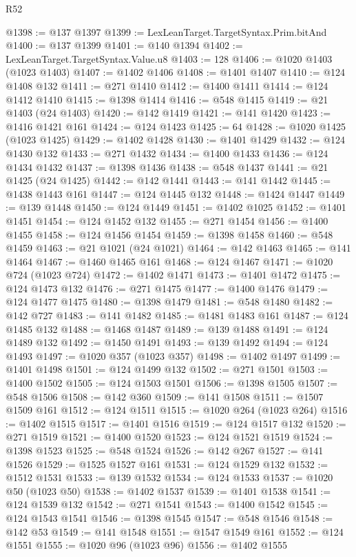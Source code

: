 \begin{lexlean}{R52}
\begin{coremodule}
@1398 := @137 @1397
@1399 := LexLeanTarget.TargetSyntax.Prim.bitAnd
@1400 := @137 @1399
@1401 := @140 @1394
@1402 := LexLeanTarget.TargetSyntax.Value.u8
@1403 := 128
@1406 := @1020 @1403 (@1023 @1403)
@1407 := @1402 @1406
@1408 := @1401 @1407
@1410 := @124 @1408 @132
@1411 := @271 @1410
@1412 := @1400 @1411
@1414 := @124 @1412 @1410
@1415 := @1398 @1414
@1416 := @548 @1415
@1419 := @21 @1403 (@24 @1403)
@1420 := @142 @1419
@1421 := @141 @1420
@1423 := @1416 @1421 @161
@1424 := @124 @1423
@1425 := 64
@1428 := @1020 @1425 (@1023 @1425)
@1429 := @1402 @1428
@1430 := @1401 @1429
@1432 := @124 @1430 @132
@1433 := @271 @1432
@1434 := @1400 @1433
@1436 := @124 @1434 @1432
@1437 := @1398 @1436
@1438 := @548 @1437
@1441 := @21 @1425 (@24 @1425)
@1442 := @142 @1441
@1443 := @141 @1442
@1445 := @1438 @1443 @161
@1447 := @124 @1445 @132
@1448 := @1424 @1447
@1449 := @139 @1448
@1450 := @124 @1449
@1451 := @1402 @1025
@1452 := @1401 @1451
@1454 := @124 @1452 @132
@1455 := @271 @1454
@1456 := @1400 @1455
@1458 := @124 @1456 @1454
@1459 := @1398 @1458
@1460 := @548 @1459
@1463 := @21 @1021 (@24 @1021)
@1464 := @142 @1463
@1465 := @141 @1464
@1467 := @1460 @1465 @161
@1468 := @124 @1467
@1471 := @1020 @724 (@1023 @724)
@1472 := @1402 @1471
@1473 := @1401 @1472
@1475 := @124 @1473 @132
@1476 := @271 @1475
@1477 := @1400 @1476
@1479 := @124 @1477 @1475
@1480 := @1398 @1479
@1481 := @548 @1480
@1482 := @142 @727
@1483 := @141 @1482
@1485 := @1481 @1483 @161
@1487 := @124 @1485 @132
@1488 := @1468 @1487
@1489 := @139 @1488
@1491 := @124 @1489 @132
@1492 := @1450 @1491
@1493 := @139 @1492
@1494 := @124 @1493
@1497 := @1020 @357 (@1023 @357)
@1498 := @1402 @1497
@1499 := @1401 @1498
@1501 := @124 @1499 @132
@1502 := @271 @1501
@1503 := @1400 @1502
@1505 := @124 @1503 @1501
@1506 := @1398 @1505
@1507 := @548 @1506
@1508 := @142 @360
@1509 := @141 @1508
@1511 := @1507 @1509 @161
@1512 := @124 @1511
@1515 := @1020 @264 (@1023 @264)
@1516 := @1402 @1515
@1517 := @1401 @1516
@1519 := @124 @1517 @132
@1520 := @271 @1519
@1521 := @1400 @1520
@1523 := @124 @1521 @1519
@1524 := @1398 @1523
@1525 := @548 @1524
@1526 := @142 @267
@1527 := @141 @1526
@1529 := @1525 @1527 @161
@1531 := @124 @1529 @132
@1532 := @1512 @1531
@1533 := @139 @1532
@1534 := @124 @1533
@1537 := @1020 @50 (@1023 @50)
@1538 := @1402 @1537
@1539 := @1401 @1538
@1541 := @124 @1539 @132
@1542 := @271 @1541
@1543 := @1400 @1542
@1545 := @124 @1543 @1541
@1546 := @1398 @1545
@1547 := @548 @1546
@1548 := @142 @53
@1549 := @141 @1548
@1551 := @1547 @1549 @161
@1552 := @124 @1551
@1555 := @1020 @96 (@1023 @96)
@1556 := @1402 @1555

\end{coremodule}
\end{lexlean}
